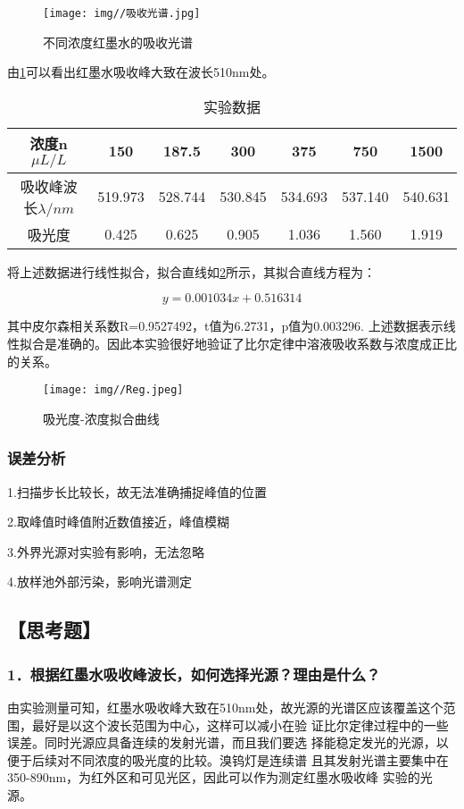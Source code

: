 \documentclass[12pt,a4paper,UTF8]{ctexart}
\begin{document}
\begin{figure}[htbp]
	\centering
	\texttt{[image: img//吸收光谱.jpg]}
	\caption{不同浓度红墨水的吸收光谱}
	\label{fig:1}
\end{figure}

由\ref{fig:1}可以看出红墨水吸收峰大致在波长510nm处。


\begin{table}[htbp]
	\caption{实验数据}
	\centering
    \begin{tabular}{|c|c|c|c|c|c|c|}
	\hline
    浓度n $\mu L/L $   & 150 & 187.5 & 300 & 375 & 750 & 1500 \\
	\hline
    吸收峰波长$\lambda /nm$ & 519.973 & 528.744 & 530.845 & 534.693 & 537.140 & 540.631 \\
	\hline
    吸光度 & 0.425 & 0.625 & 0.905 & 1.036 & 1.560 & 1.919 \\
	\hline
	\end{tabular}%
	\label{tab:data}%
\end{table}%
将上述数据进行线性拟合，拟合直线如\ref{fig:2}所示，其拟合直线方程为：

\begin{equation*}
	y=0.001034x+0.516314
\end{equation*}

其中皮尔森相关系数R=0.9527492，t值为6.2731，p值为0.003296.
上述数据表示线性拟合是准确的。因此本实验很好地验证了比尔定律中溶液吸收系数与浓度成正比的关系。


\begin{figure}[htbp]
	\centering
	\texttt{[image: img//Reg.jpeg]}
	\caption{吸光度-浓度拟合曲线}
	\label{fig:2}
\end{figure}

\newpage
\subsubsection*{误差分析}
1.扫描步长比较长，故无法准确捕捉峰值的位置

2.取峰值时峰值附近数值接近，峰值模糊

3.外界光源对实验有影响，无法忽略

4.放样池外部污染，影响光谱测定

\subsection*{【思考题】}
\subsubsection*{1．根据红墨水吸收峰波长，如何选择光源？理由是什么？}
由实验测量可知，红墨水吸收峰大致在510nm处，故光源的光谱区应该覆盖这个范围，最好是以这个波长范围为中心，这样可以减小在验
证比尔定律过程中的一些误差。同时光源应具备连续的发射光谱，而且我们要选
择能稳定发光的光源，以便于后续对不同浓度的吸光度的比较。溴钨灯是连续谱
且其发射光谱主要集中在350-890nm，为红外区和可见光区，因此可以作为测定红墨水吸收峰
实验的光源。
\end{document}
